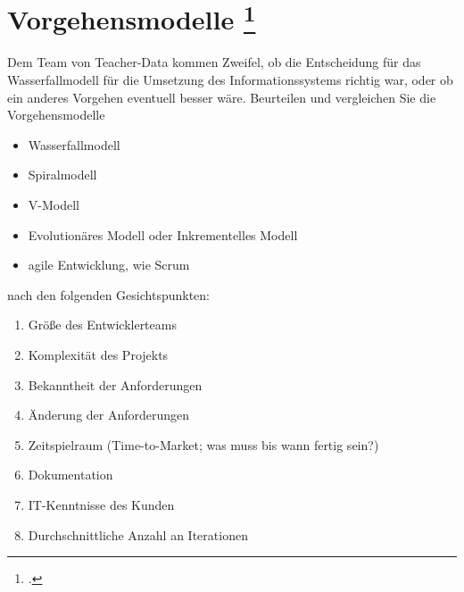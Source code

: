 \documentclass{bschlangaul-aufgabe}
\begin{document}
%

\section{Vorgehensmodelle
\footcite[Aufgabe 2]{sosy:ab:1}}

Dem Team von Teacher-Data kommen Zweifel, ob die Entscheidung für das
Wasserfallmodell für die Umsetzung des Informationssystems richtig war,
oder ob ein anderes Vorgehen eventuell besser wäre. Beurteilen und
vergleichen Sie die Vorgehensmodelle

\begin{itemize}
\item Wasserfallmodell
\item Spiralmodell
\item V-Modell
\item Evolutionäres Modell oder
Inkrementelles Modell
\item agile Entwicklung, wie \zB Scrum
\end{itemize}

\noindent
nach den folgenden Gesichtspunkten:

\begin{enumerate}
\item Größe des Entwicklerteams
\item Komplexität des Projekts
\item Bekanntheit der Anforderungen
\item Änderung der Anforderungen
\item Zeitspielraum (Time-to-Market; was muss bis wann fertig sein?)
\item Dokumentation
\item IT-Kenntnisse des Kunden
\item Durchschnittliche Anzahl an Iterationen
\end{enumerate}
\end{document}
